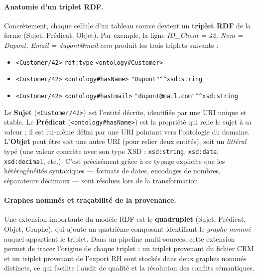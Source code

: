 \paragraph{Anatomie d'un triplet RDF.}
Concrètement, chaque cellule d'un tableau source devient
un \textbf{triplet RDF} de la forme (Sujet, Prédicat, Objet).
Par exemple, la ligne \textit{ID\_Client = 42, Nom = Dupont,
Email = dupont@mail.com} produit les trois triplets suivants :

\begin{itemize}
    \item \texttt{<Customer/42>} \quad
          \texttt{rdf:type} \quad
          \texttt{<ontology\#Customer>}
    \item \texttt{<Customer/42>} \quad
          \texttt{<ontology\#hasName>} \quad
          \texttt{"Dupont"\^{}\^{}xsd:string}
    \item \texttt{<Customer/42>} \quad
          \texttt{<ontology\#hasEmail>} \quad
          \texttt{"dupont@mail.com"\^{}\^{}xsd:string}
\end{itemize}

Le \textbf{Sujet} (\texttt{<Customer/42>}) est l'entité décrite,
identifiée par une URI unique et stable.
Le \textbf{Prédicat} (\texttt{<ontology\#hasName>}) est la propriété
qui relie le sujet à sa valeur ; il est lui-même défini par une URI
pointant vers l'ontologie du domaine.
L'\textbf{Objet} peut être soit une autre URI (pour relier deux entités),
soit un \textit{littéral} typé (une valeur concrète avec son type XSD :
\texttt{xsd:string}, \texttt{xsd:date}, \texttt{xsd:decimal}, etc.).
C'est précisément grâce à ce typage explicite que les hétérogénéités
syntaxiques --- formats de dates, encodages de nombres, séparateurs
décimaux --- sont résolues lors de la transformation.

\paragraph{Graphes nommés et traçabilité de la provenance.}
Une extension importante du modèle RDF est le \textbf{quadruplet}
(Sujet, Prédicat, Objet, Graphe), qui ajoute un quatrième composant
identifiant le \textit{graphe nommé} auquel appartient le triplet.
Dans un pipeline multi-sources, cette extension permet de tracer
l'origine de chaque triplet : un triplet provenant du fichier CRM
et un triplet provenant de l'export RH sont stockés dans deux graphes
nommés distincts, ce qui facilite l'audit de qualité et
la résolution des conflits sémantiques.

